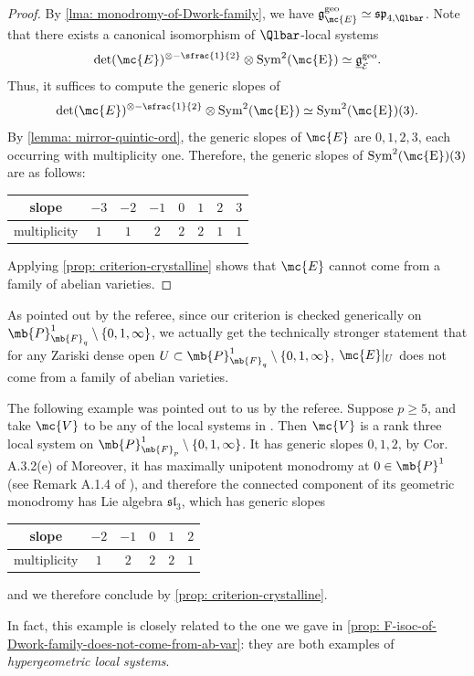 \begin{proof}
By \cref{lma: monodromy-of-Dwork-family}, we have $\mathfrak{g}^{\rm{geo}}_{\mc{E}}\simeq\mathfrak{sp}_{4,\Qlbar}$. Note that there exists a canonical isomorphism of $\Qlbar$-local systems
\[
\det(\mc{E})^{\otimes-\sfrac{1}{2}}\otimes \rm{Sym}^2(\mc{E})\simeq\underline{\mathfrak{g}}_{\mathcal{E}}^\mathrm{geo}.
\]
Thus, it suffices to compute the generic slopes of
\[
\det(\mc{E})^{\otimes-\sfrac{1}{2}}\otimes \rm{Sym}^2(\mc{E})\simeq\rm{Sym}^2(\mc{E})(3).
\]
By \cref{lemma: mirror-quintic-ord}, the generic slopes of $\mc{E}$ are $0,1,2,3$, each occurring with multiplicity one. Therefore, the generic slopes of $\rm{Sym}^2(\mc{E})(3)$ are as follows:
\begin{center}
\begin{tabular}{ c|c|c|c|c|c|c|c }
slope & $-3$ & $-2$ & $-1$ & $0$ & $1$ & $2$ & $3$\\
\hline
multiplicity & $1$ & $1$ & $2$ & $2$ & $2$ & $1$ & $1$
\end{tabular}
\end{center}
Applying \cref{prop: criterion-crystalline} shows that $\mc{E}$ cannot come from a family of abelian varieties.
\end{proof}

\begin{rmk}
As pointed out by the referee, since our criterion is checked generically on $\mb{P}^1_{\mb{F}_q}\setminus \{0,1,\infty\}$, we actually get the technically stronger statement that for any Zariski dense open $U\subset \mb{P}^1_{\mb{F}_q}\setminus \{0,1, \infty\}$, $\mc{E}|_{U}$ does not come from a family of abelian varieties.
\end{rmk}

\begin{rmk}\label{rmk: more-examples}
The following example was pointed out to us by the referee. Suppose $p\geq 5$, and take $\mc{V}$ to be any of the local systems in \cite[Prop.\,A.2.1]{Drinfeld-Kedlaya-Slopes-of-Indecomposable-F-Isocrystals}. Then $\mc{V}$ is a rank three local system on $\mb{P}^1_{\mb{F}_p}\setminus \{0,1,\infty\}$. It has generic slopes $0,1,2$, by Cor.\,A.3.2(e) of \loccit Moreover, it has maximally unipotent monodromy at $0\in \mb{P}^1$ (see Remark A.1.4 of \loccit), and therefore the connected component of its geometric monodromy has Lie algebra $\mathfrak{sl}_3$, which has generic slopes

\begin{center}
\begin{tabular}{ c|c|c|c|c|c }
slope & $-2$ & $-1$ & $0$ & $1$ & $2$ \\
\hline
multiplicity & $1$ & $2$ & $2$ & $2$ & $1$
\end{tabular}
\end{center}
and we therefore conclude by \cref{prop: criterion-crystalline}.

In fact, this example is closely related to the one we gave in \cref{prop: F-isoc-of-Dwork-family-does-not-come-from-ab-var}: they are both examples of \emph{hypergeometric local systems}.
\end{rmk}

